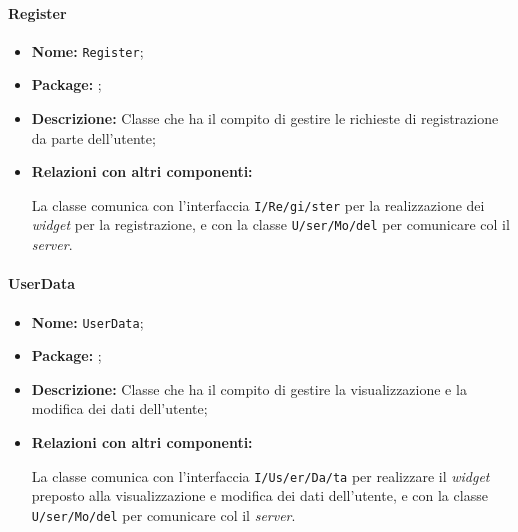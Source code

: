 \paragraph{Register}
\begin{flushleft}
\begin{itemize}
\item \textbf{Nome:} \texttt{Register};
\item \textbf{Package:} \texttt{\logicUser};
\item \textbf{Descrizione:} Classe che ha il compito di gestire le richieste di registrazione da parte dell'utente;
\item \textbf{Relazioni con altri componenti:}
\begin{sloppypar}
La classe comunica con l'interfaccia \texttt{\viewUser{}I\fshyp{}Re\fshyp{}gi\fshyp{}ster} per la realizzazione dei \textit{widget} per la registrazione, e con la classe \texttt{\model{}U\fshyp{}ser\fshyp{}Mo\fshyp{}del} per comunicare col il \textit{server}.
\end{sloppypar}
\end{itemize}
\end{flushleft}

\paragraph{UserData}
\begin{flushleft}
\begin{itemize}
\item \textbf{Nome:} \texttt{UserData};
\item \textbf{Package:} \texttt{\logicUser};
\item \textbf{Descrizione:} Classe che ha il compito di gestire la visualizzazione e la modifica dei dati dell'utente;
\item \textbf{Relazioni con altri componenti:}
\begin{sloppypar}
La classe comunica con l'interfaccia \texttt{\logicUser{}I\fshyp{}Us\fshyp{}er\fshyp{}Da\fshyp{}ta} per realizzare il \textit{widget} preposto alla visualizzazione e modifica dei dati dell'utente, e con la classe \texttt{\model{}U\fshyp{}ser\fshyp{}Mo\fshyp{}del} per comunicare col il \textit{server}.
\end{sloppypar}
\end{itemize}
\end{flushleft}

